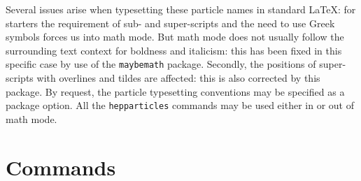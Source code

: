 \documentclass[12pt]{article}
\newcommand{\hepparticles}{\texttt{hepparticles}\xspace}
\begin{document}
Several issues arise when typesetting these particle names in standard \LaTeX{}:
for starters the requirement of sub- and super-scripts and the need to use Greek
symbols forces us into math mode. But math mode does not usually follow the
surrounding text context for boldness and italicism: this has been fixed in this
specific case by use of the \texttt{maybemath} package. Secondly, the positions
of super-scripts with overlines and tildes are affected: this is also corrected
by this package. By request, the particle typesetting conventions may be
specified as a package option. All the \hepparticles commands may be used either
in or out of math mode.


\section{Commands}
\end{document}
